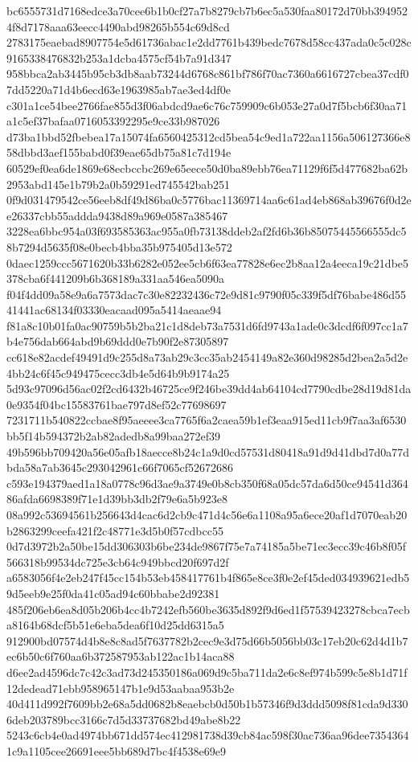 \documentclass[11pt,a4paper]{article}
\begin{document}
{bc6555731d7168edce3a70cee6b1b0cf27a7b8279cb7b6ec5a530faa80172d70bb3949524f8d7178aaa63eecc4490abd98265b554c69d8cd
2783175eaebad8907754e5d61736abac1e2dd7761b439bedc7678d58cc437ada0c5c028c9165338476832b253a1dcba4575cf54b7a91d347
958bbca2ab3445b95cb3db8aab73244d6768c861bf786f70ac7360a6616727cbea37cdf07dd5220a71d4b6ecd63e1963985ab7ae3ed4df0e
c301a1ce54bee2766fae855d3f06abdcd9ae6c76c759909c6b053e27a0d7f5bcb6f30aa71a1c5ef37bafaa0716053392295e9ce33b987026
d73ba1bbd52fbebea17a15074fa6560425312cd5bea54c9ed1a722aa1156a506127366e858dbbd3aef155babd0f39eae65db75a81c7d194e
60529ef0ea6de1869e68ecbccbc269e65eece50d0ba89ebb76ea71129f6f5d477682ba62b2953abd145e1b79b2a0b59291ed745542bab251
0f9d031479542ce56eeb8df49d86ba0c5776bac11369714aa6c61ad4eb868ab39676f0d2ee26337cbb55addda9438d89a969e0587a385467
3228ea6bbc954a03f693585363ac955a0fb73138ddeb2af2fd6b36b85075445566555dc58b7294d5635f08e0becb4bba35b975405d13e572
0daec1259ccc5671620b33b6282e052ee5cb6f63ea77828e6ec2b8aa12a4eeca19c21dbe5378cba6f441209b6b368189a331aa546ea5090a
f04f4dd09a58e9a6a7573dac7c30e82232436c72e9d81c9790f05c339f5df76babe486d5541441ac68134f03330eacaad095a5414aeaae94
f81a8c10b01fa0ac90759b5b2ba21c1d8deb73a7531d6fd9743a1ade0c3dcdf6f097cc1a7b4e756dab664abd9b69ddd0e7b90f2e87305897
cc618e82acdef49491d9c255d8a73ab29c3cc35ab2454149a82e360d98285d2bea2a5d2e4bb24c6f45c949475cecc3db4e5d64b9b9174a25
5d93c97096d56ac02f2cd6432b46725ce9f246be39dd4ab64104cd7790cdbe28d19d81da0e9354f04bc15583761bae797d8ef52c77698697
7231711b540822ccbae8f95aeeee3ca7765f6a2caea59b1ef3eaa915ed11cb9f7aa3af6530bb5f14b594372b2ab82adedb8a99baa272ef39
49b596bb709420a56e05afb18aecce8b24c1a9d0cd57531d80418a91d9d41dbd7d0a77dbda58a7ab3645c293042961c66f7065cf52672686
c593e194379aed1a18a0778c96d3ae9a3749e0b8cb350f68a05dc57da6d50ce94541d36486afda6698389f71e1d39bb3db2f79e6a5b923e8
08a992c53694561b256643d4cac6d2cb9c471d4c56e6a1108a95a6ece20af1d7070eab20b2863299ceefa421f2c48771e3d5b0f57cdbcc55
0d7d3972b2a50be15dd306303b6be234de9867f75e7a74185a5be71ec3ecc39c46b8f05f566318b99534dc725e3cb64c949bbcd20f697d2f
a6583056f4e2eb247f45cc154b53eb458417761b4f865e8ce3f0e2ef45ded034939621edb59d5eeb9e25f0da41c05ad94c60bbabe2d92381
485f206eb6ea8d05b206b4cc4b7242efb560be3635d892f9d6ed1f57539423278cbca7ecba8164b68dcf5b51e6eba5dea6f10d25dd6315a5
912900bd07574d4b8e8c8ad5f7637782b2cec9e3d75d66b5056bb03c17eb20c62d4d1b7ec6b50c6f760aa6b372587953ab122ac1b14aca88
d6ee2ad4596dc7c42c3ad73d245350186a069d9c5ba711da2e6c8ef974b599c5e8b1d71f12dedead71ebb958965147b1e9d53aabaa953b2e
40d411d992f7609bb2e68a5dd0682b8eaebcb0d50b1b57346f9d3ddd5098f81cda9d3306deb203789bcc3166c7d5d33737682bd49abe8b22
5243c6cb4e0ad4974bb671dd574ec412981738d39cb84ac598f30ac736aa96dee73543641c9a1105cee26691eee5bb689d7bc4f4538e69e9
}
\end{document}
